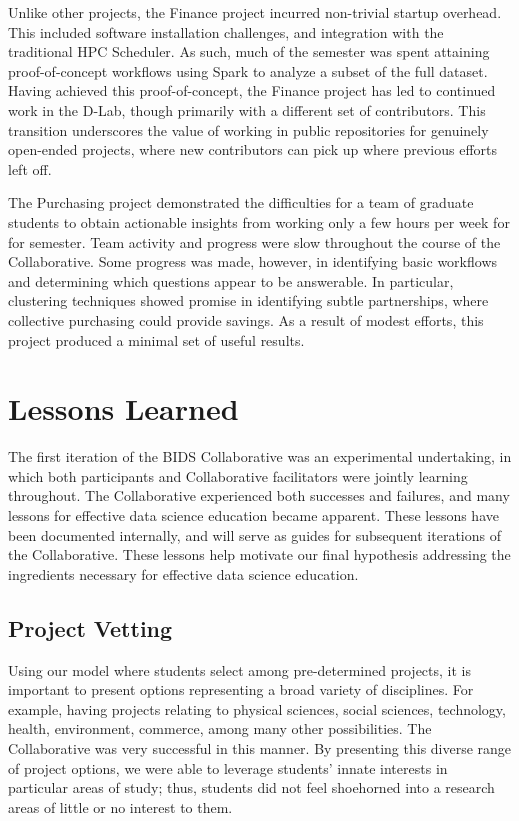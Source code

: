 \documentclass[12pt]{article}
\begin{document}
Unlike other projects, the Finance project incurred non-trivial startup overhead.  This included software installation challenges, and integration with the traditional HPC Scheduler. As such, much of the semester was spent attaining proof-of-concept workflows using Spark to analyze a subset of the full dataset.  Having achieved this proof-of-concept, the Finance project has led to continued work in the D-Lab, though primarily with a different set of contributors. This transition underscores the value of working in public repositories for genuinely open-ended projects, where new contributors can pick up where previous efforts left off.

The Purchasing project demonstrated the difficulties for a team of graduate students to obtain actionable insights from working only a few hours per week for for semester.  Team activity and progress were slow throughout the course of the Collaborative.  Some progress was made, however, in identifying basic workflows and determining which questions appear to be answerable. In particular, clustering techniques showed promise in identifying subtle partnerships, where collective purchasing could provide savings.  As a result of modest efforts, this project produced a minimal set of useful results.



\section{Lessons Learned}

The first iteration of the BIDS Collaborative was an experimental undertaking, in which both participants and Collaborative facilitators were jointly learning throughout.  The Collaborative experienced both successes and failures, and many lessons for effective data science education became apparent.  These lessons have been documented internally, and will serve as guides for subsequent iterations of the Collaborative. These lessons help motivate our final hypothesis addressing the ingredients necessary for effective data science education.

\subsection{Project Vetting}

Using our model where students select among pre-determined projects, it is important to present options representing a broad variety of disciplines.  For example, having projects relating to physical sciences, social sciences, technology, health, environment, commerce, among many other possibilities.  The Collaborative was very successful in this manner.  By presenting this diverse range of project options, we were able to leverage students' innate interests in particular areas of study; thus, students did not feel shoehorned into a research areas of little or no interest to them.
\end{document}
